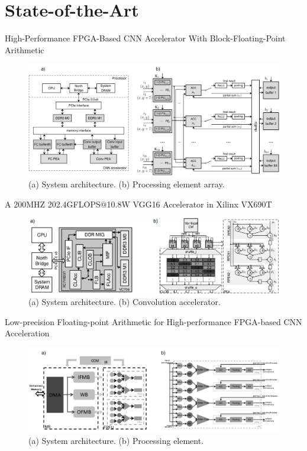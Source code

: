\section{State-of-the-Art}
	\tableofcontents[currentsection]
	
	\begin{frame}{High-Performance FPGA-Based CNN Accelerator With Block-Floating-Point Arithmetic}
		\centering
		\begin{figure}
			\includegraphics[width=\textwidth]{../figures/3_g.png}
			\caption{(a) System architecture. (b) Processing element array.}
		\end{figure}
	\end{frame}
	
	\begin{frame}{A 200MHZ 202.4GFLOPS@10.8W VGG16 Accelerator in Xilinx VX690T}
		\centering
		\begin{figure}
			\includegraphics[width=\textwidth]{../figures/1_g.png}
			\caption{(a) System architecture. (b) Convolution accelerator.}
		\end{figure}
	\end{frame}
	
	\begin{frame}{Low-precision Floating-point Arithmetic for High-performance FPGA-based CNN Acceleration}
		\centering
		\begin{figure}
			\includegraphics[width=\textwidth]{../figures/2_g.png}
			\caption{(a) System architecture. (b) Processing element.}
		\end{figure}
	\end{frame}

